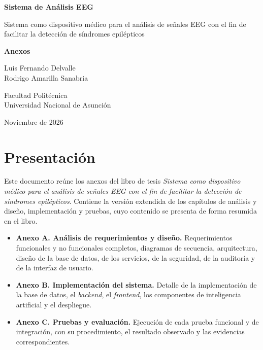 \documentclass[spanish, 12pt, oneside]{Thesis}
\begin{document}
\addto\captionsspanish{\renewcommand{\appendixname}{Anexo}}
\renewcommand{\appendixname}{Anexo}

\pagestyle{empty}
\begin{center}
\vspace*{4cm}
{\LARGE\bfseries Sistema de Análisis EEG\par}
\vspace{0.8cm}
{\Large Sistema como dispositivo médico para el análisis de señales EEG con el fin de facilitar la detección de síndromes epilépticos\par}
\vspace{2cm}
{\huge\bfseries Anexos\par}
\vspace{2cm}
{\large Luis Fernando Delvalle \\ Rodrigo Amarilla Sanabria\par}
\vspace{1.5cm}
{\large Facultad Politécnica \\ Universidad Nacional de Asunción\par}
\vfill
{\large Noviembre de 2026\par}
\end{center}
\clearpage

\pagestyle{fancy}
\chapter*{Presentación}

Este documento reúne los anexos del libro de tesis \emph{Sistema como dispositivo médico para el análisis de señales EEG con el fin de facilitar la detección de síndromes epilépticos}.
Contiene la versión extendida de los capítulos de análisis y diseño, implementación y pruebas, cuyo contenido se presenta de forma resumida en el libro.

\begin{itemize}
    \item \textbf{Anexo A. Análisis de requerimientos y diseño.} Requerimientos funcionales y no funcionales completos, diagramas de secuencia, arquitectura, diseño de la base de datos, de los servicios, de la seguridad, de la auditoría y de la interfaz de usuario.
    \item \textbf{Anexo B. Implementación del sistema.} Detalle de la implementación de la base de datos, el \textit{backend}, el \textit{frontend}, los componentes de inteligencia artificial y el despliegue.
    \item \textbf{Anexo C. Pruebas y evaluación.} Ejecución de cada prueba funcional y de integración, con su procedimiento, el resultado observado y las evidencias correspondientes.
\end{itemize}
\end{document}
